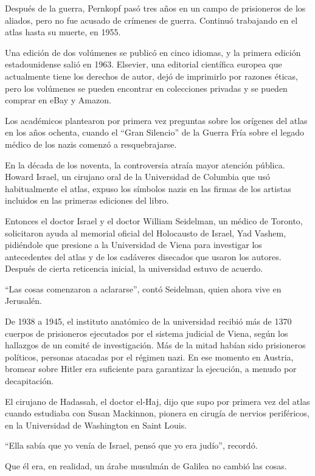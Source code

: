 Después de la guerra, Pernkopf pasó tres años en un campo de prisioneros
de los aliados, pero no fue acusado de crímenes de guerra. Continuó
trabajando en el atlas hasta su muerte, en 1955.

Una edición de dos volúmenes se publicó en cinco idiomas, y la primera
edición estadounidense salió en 1963. Elsevier, una editorial científica
europea que actualmente tiene los derechos de autor, dejó de imprimirlo
por razones éticas, pero los volúmenes se pueden encontrar en
colecciones privadas y se pueden comprar en eBay y Amazon.

Los académicos plantearon por primera vez preguntas sobre los orígenes
del atlas en los años ochenta, cuando el ``Gran Silencio'' de la Guerra
Fría sobre el legado médico de los nazis comenzó a resquebrajarse.

En la década de los noventa, la controversia atraía mayor atención
pública. Howard Israel, un cirujano oral de la Universidad de Columbia
que usó habitualmente el atlas, expuso los símbolos nazis en las firmas
de los artistas incluidos en las primeras ediciones del libro.

Entonces el doctor Israel y el doctor William Seidelman, un médico de
Toronto, solicitaron ayuda al memorial oficial del Holocausto de Israel,
Yad Vashem, pidiéndole que presione a la Universidad de Viena para
investigar los antecedentes del atlas y de los cadáveres disecados que
usaron los autores. Después de cierta reticencia inicial, la universidad
estuvo de acuerdo.

``Las cosas comenzaron a aclararse'', contó Seidelman, quien ahora vive
en Jerusalén.

De 1938 a 1945, el instituto anatómico de la universidad recibió más de
1370 cuerpos de prisioneros ejecutados por el sistema judicial de Viena,
según los hallazgos de un comité de investigación. Más de la mitad
habían sido prisioneros políticos, personas atacadas por el régimen
nazi. En ese momento en Austria, bromear sobre Hitler era suficiente
para garantizar la ejecución, a menudo por decapitación.

El cirujano de Hadassah, el doctor el-Haj, dijo que supo por primera vez
del atlas cuando estudiaba con Susan Mackinnon, pionera en cirugía de
nervios periféricos, en la Universidad de Washington en Saint Louis.

``Ella sabía que yo venía de Israel, pensó que yo era judío'', recordó.

Que él era, en realidad, un árabe musulmán de Galilea no cambió las
cosas.

